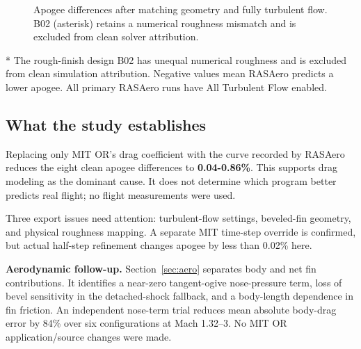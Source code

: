 \documentclass[oneside,openany]{amsdtx}
\begin{document}
\begin{figure}[H]\centering
{}
\caption{Apogee differences after matching geometry and fully turbulent flow. B02 (asterisk) retains a numerical roughness mismatch and is excluded from clean solver attribution.}\label{fig:apogee}
\end{figure}

* The rough-finish design B02 has unequal numerical roughness and is excluded from clean simulation attribution. Negative values mean RASAero predicts a lower apogee. All primary RASAero runs have All Turbulent Flow enabled.


\subsection{What the study establishes}

Replacing only MIT OR's drag coefficient with the curve recorded by RASAero reduces the eight clean apogee differences to \textbf{0.04-0.86\%}. This supports drag modeling as the dominant cause. It does not determine which program better predicts real flight; no flight measurements were used.


Three export issues need attention: turbulent-flow settings, beveled-fin geometry, and physical roughness mapping. A separate MIT time-step override is confirmed, but actual half-step refinement changes apogee by less than 0.02\% here.


\textbf{Aerodynamic follow-up.} Section~\ref{sec:aero} separates body and net fin contributions. It identifies a near-zero tangent-ogive nose-pressure term, loss of bevel sensitivity in the detached-shock fallback, and a body-length dependence in fin friction. An independent nose-term trial reduces mean absolute body-drag error by 84\% over six configurations at Mach 1.32--3. No MIT OR application/source changes were made.
\end{document}
